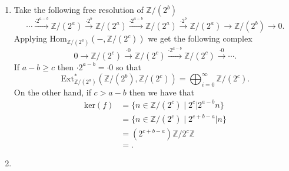 \documentclass[a4paper]{article}
\begin{document}
\begin{exercise}{2}
\begin{enumerate}[label=(\roman*)]
    \item Take the following free resolution of $ \mathbb{Z}/(2^{b}) $
      \begin{equation*}
      \cdots \xrightarrow{\cdot 2^{a-b}} \mathbb{Z}/(2^{a}) \xrightarrow{\cdot 2^{b}} \mathbb{Z}/(2^{a}) \xrightarrow{\cdot 2^{a - b}} \mathbb{Z}/(2^{a}) \xrightarrow{\cdot 2^{b}} \mathbb{Z}/(2^{a}) \to \mathbb{Z}/(2^{b}) \to 0
      .\end{equation*}
      Applying $ \text{Hom}_{\mathbb{Z}/(2^{a})} (-, \mathbb{Z}/(2^{c})) $ we get the following complex
      \begin{equation*}
        0 \to \mathbb{Z}/(2^{c}) \xrightarrow{\cdot 0} \mathbb{Z}/(2^{c}) \xrightarrow{\cdot 2^{a - b}} \mathbb{Z}/(2^{c}) \xrightarrow{\cdot 0} \cdots
      .\end{equation*}
      If $ a - b\geq c $ then $ \cdot 2^{a - b} = \cdot 0 $ so that
      \begin{equation*}
        \text{Ext}^{*}_{\mathbb{Z}/(2^{a})}(\mathbb{Z}/(2^{b}), \mathbb{Z}/(2^{c})) = \bigoplus_{ i = 0}^{\infty} \mathbb{Z}/(2^{c})
      .\end{equation*}
      On the other hand, if $ c > a - b $ then we have that
      \begin{align*}
        \text{ker}(f) &= \{n \in \mathbb{Z}/(2^{c}) \mid 2^{c} | 2^{a- b}n\} \\
                      &= \{n \in \mathbb{Z}/(2^{c}) \mid 2^{c + b - a} | n\} \\
                      &= (2^{c + b - a})\mathbb{Z}/2^{c}\mathbb{Z} \\
                      &=
      .\end{align*}

    \item
  \end{enumerate}
\end{exercise}
\end{document}

